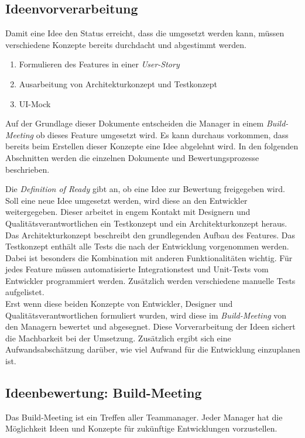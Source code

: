 \subsection{Ideenvorverarbeitung}
Damit eine Idee den Status erreicht, dass die umgesetzt werden kann, müssen verschiedene Konzepte bereits durchdacht und abgestimmt werden. 
\begin{enumerate}
    \item Formulieren des Features in einer \textit{User-Story}
    \item Ausarbeitung von Architekturkonzept und Testkonzept
    \item UI-Mock
\end{enumerate}
Auf der Grundlage dieser Dokumente entscheiden die Manager in einem \textit{Build-Meeting} ob dieses Feature 
umgesetzt wird. Es kann durchaus vorkommen, dass bereits beim Erstellen dieser Konzepte eine Idee abgelehnt wird. In den folgenden Abschnitten werden
die einzelnen Dokumente und Bewertungsprozesse beschrieben.

Die \textit{Definition of Ready} gibt an, ob eine Idee zur Bewertung freigegeben wird.
Soll eine neue Idee umgesetzt werden, wird diese an den Entwickler weitergegeben. Dieser 
arbeitet in engem Kontakt mit Designern und Qualitätsverantwortlichen ein Testkonzept und ein Architekturkonzept heraus. 
Das Architekturkonzept beschreibt den grundlegenden Aufbau des Features. 
Das Testkonzept enthält alle Tests die nach der Entwicklung vorgenommen werden. Dabei ist besonders die Kombination mit anderen Funktionalitäten 
wichtig. Für jedes Feature müssen automatisierte Integrationstest und Unit-Tests vom Entwickler programmiert werden. Zusätzlich werden verschiedene
manuelle Tests aufgelistet.\\
Erst wenn diese beiden Konzepte von Entwickler, Designer und Qualitätsverantwortlichen formuliert wurden, wird diese im 
\textit{Build-Meeting} von den Managern bewertet und abgesegnet. Diese Vorverarbeitung der Ideen sichert die Machbarkeit bei der Umsetzung. Zusätzlich ergibt 
sich eine Aufwandsabschätzung darüber, wie viel Aufwand für die Entwicklung einzuplanen ist. 

\subsection{Ideenbewertung: Build-Meeting}
Das Build-Meeting ist ein Treffen aller Teammanager. Jeder Manager hat die Möglichkeit Ideen und Konzepte für zukünftige Entwicklungen 
vorzustellen. 

